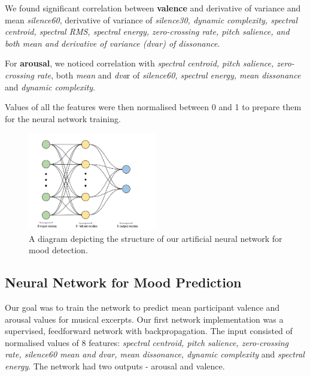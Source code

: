 We found significant correlation between \textbf{valence} and derivative of variance and mean \textit{silence60}, derivative of variance of \textit{silence30, dynamic complexity, spectral centroid, spectral RMS, spectral energy, zero-crossing rate, pitch salience, and both mean and derivative of variance (dvar) of dissonance}. 

For \textbf{arousal}, we noticed correlation with \textit{spectral centroid, pitch salience, zero-crossing rate}, both \textit{mean} and \textit{dva}r of  \textit{silence60, spectral energy, mean dissonance} and \textit{dynamic complexity}. 

Values of all the features were then normalised between 0 and 1 to prepare them for the neural network training. 

\begin{figure}
  \vspace{-30pt}
  \begin{center}
    \includegraphics[width=0.5\textwidth]{Figures/myANN}
  \end{center}
  \caption{A diagram depicting the structure of our artificial neural network for mood detection.}
\label{fig:finalnetwork}
\end{figure}

\vspace{10pt}

\subsection{Neural Network for Mood Prediction}

Our goal was to train the network to predict mean participant valence and arousal values for musical excerpts. 
Our first network implementation was a supervised, feedforward network with backpropagation. 
The input consisted of normalised values of 8 features:
\textit{spectral centroid, pitch salience, zero-crossing rate, silence60 mean  and dvar, mean dissonance, dynamic complexity} and \textit{spectral energy}. 
The network had two outputs - arousal and valence.

